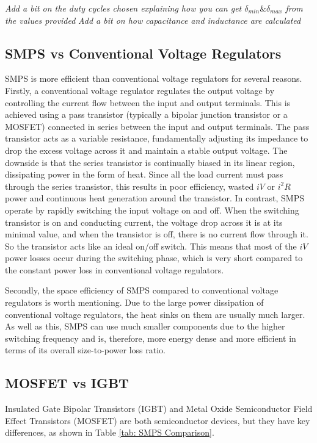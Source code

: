         \textit{Add a bit on the duty cycles chosen explaining how you can get \(\delta_{min} \& \delta_{max}\) from the values provided}
        \textit{Add a bit on how capacitance and inductance are calculated}

    \subsection{SMPS vs Conventional Voltage Regulators}
        SMPS is more efficient than conventional voltage regulators for several reasons. 
        Firstly, a conventional voltage regulator regulates the output voltage by controlling the current flow between the input and output terminals. This is achieved using a pass transistor (typically a bipolar junction transistor or a MOSFET) connected in series between the input and output terminals. The pass transistor acts as a variable resistance, fundamentally adjusting its impedance to drop the excess voltage across it and maintain a stable output voltage. The downside is that the series transistor is continually biased in its linear region, dissipating power in the form of heat. Since all the load current must pass through the series transistor, this results in poor efficiency, wasted \(iV\) or \(i^2R\) power and continuous heat generation around the transistor. In contrast, SMPS operate by rapidly switching the input voltage on and off. When the switching transistor is on and conducting current, the voltage drop across it is at its minimal value, and when the transistor is off, there is no current flow through it. So the transistor acts like an ideal on/off switch. This means that most of the \(iV\) power losses occur during the switching phase, which is very short compared to the constant power loss in conventional voltage regulators.
        
        Secondly, the space efficiency of SMPS compared to conventional voltage regulators is worth mentioning. Due to the large power dissipation of conventional voltage regulators, the heat sinks on them are usually much larger. As well as this, SMPS can use much smaller components due to the higher switching frequency and is, therefore, more energy dense and more efficient in terms of its overall size-to-power loss ratio.

    \subsection{MOSFET vs IGBT}
        Insulated Gate Bipolar Transistors (IGBT) and Metal Oxide Semiconductor Field Effect Transistors (MOSFET) are both semiconductor devices, but they have key differences, as shown in Table \ref{tab: SMPS Comparison}.
        

